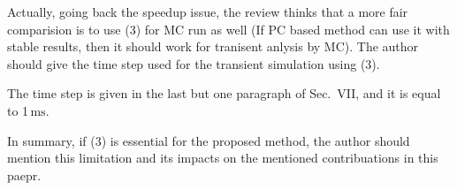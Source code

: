 \begin{reviewer}
Actually, going back the speedup issue, the review thinks that a more fair comparision is to use (3) for MC run as well (If PC based method can use it with stable results, then it should work for tranisent anlysis by MC). The author should give the time step used for the transient simulation using (3).
\end{reviewer}
\begin{authors}
The time step is given in the last but one paragraph of Sec.~VII, and it is equal to 1$\,\text{ms}$.

\begin{actions}
\end{actions}
\end{authors}

\begin{reviewer}
In summary, if (3) is essential for the proposed method, the author should mention this limitation and its impacts on the mentioned contribuations in this paepr.
\end{reviewer}
\begin{authors}
\end{authors}
%
%
%
%
%
%
%
